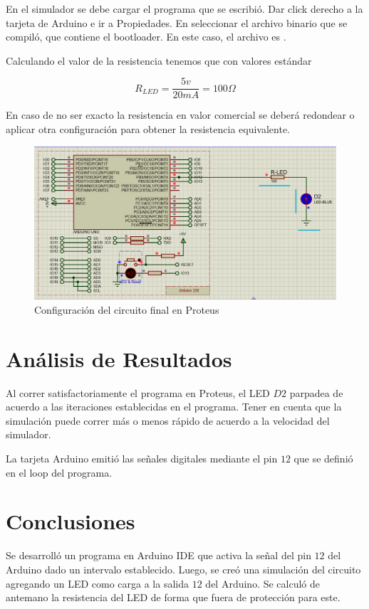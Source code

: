 \documentclass{article}
\begin{document}
    En el simulador se debe cargar el programa que se escribió. Dar click
    derecho a la tarjeta de Arduino e ir a
    Propiedades. En  seleccionar el archivo binario
    que se compiló, que contiene el bootloader.
    En este caso, el archivo es .

    \bigbreak

    Calculando el valor de la resistencia tenemos que con valores estándar

    $$
    R_{LED} = \frac{5v}{20mA} = 100\Omega
    $$

    En caso de no ser exacto la resistencia en valor comercial se deberá
    redondear o aplicar otra configuración para obtener la resistencia
    equivalente.

    \begin{figure}[H]
        \centering
        \includegraphics[width=0.5\paperwidth]{images/sim-2.png}
        \caption{Configuración del circuito final en Proteus}
    \end{figure}

    \section{Análisis de Resultados}

    Al correr satisfactoriamente el programa en Proteus, el LED $D2$ parpadea
    de acuerdo a las iteraciones establecidas en el programa. Tener en cuenta
    que la simulación puede correr más o menos rápido de acuerdo a la
    velocidad del simulador.

    \bigbreak

    La tarjeta Arduino emitió las señales digitales mediante el pin $12$ que
    se definió en el loop del programa.

    \section{Conclusiones}

    Se desarrolló un programa en Arduino IDE que activa la señal del pin $12$
    del Arduino dado un intervalo establecido. Luego, se creó una simulación
    del circuito agregando un LED como carga a la salida $12$ del Arduino. Se
    calculó de antemano la resistencia del LED de forma que fuera de
    protección para este.

    \printbibliography
\end{document}
